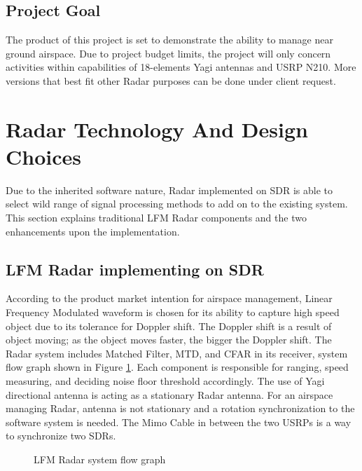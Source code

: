 \documentclass[letterpaper, 12 pt, conference]{report}
\numberwithin{figure}{section}
\begin{document}
\subsection{Project Goal}
The product of this project is set to demonstrate the ability to manage near ground airspace. Due to project budget limits, the project will only concern activities within capabilities of 18-elements Yagi antennas and USRP N210. More versions that best fit other Radar purposes can be done under client request. 
\newpage
\section{Radar Technology And Design Choices}
Due to the inherited software nature, Radar implemented on SDR is able to select wild range of signal processing methods to add on to the existing system. This section explains traditional LFM Radar components and the two enhancements upon the implementation.
\subsection{LFM Radar implementing on SDR}
According to the product market intention for airspace management, Linear Frequency Modulated waveform is chosen for its ability to capture high speed object due to its tolerance for Doppler shift. The Doppler shift is a result of object moving; as the object moves faster, the bigger the Doppler shift. The Radar system includes Matched Filter, MTD, and CFAR in its receiver, system flow graph shown in Figure \ref{fig:LFMcomp}. Each component is responsible for ranging, speed measuring, and deciding noise floor threshold accordingly. The use of Yagi directional antenna is acting as a stationary Radar antenna. For an airspace managing Radar, antenna is not stationary and a rotation synchronization to the software system is needed. The Mimo Cable in between the two USRPs is a way to synchronize two SDRs. \\
\begin{figure}[h]
\centering{}
\caption{LFM Radar system flow graph}
\label{fig:LFMcomp}
\end{figure}
\FloatBarrier
\end{document}
